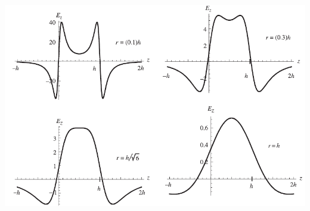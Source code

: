\begin{loigiai}
\begin{enumerate}[1)]
            \begin{center}
                \includegraphics[width=\textwidth]{Anh/c2.pdf}
            \end{center}
        \end{enumerate}
       
    \end{loigiai}
